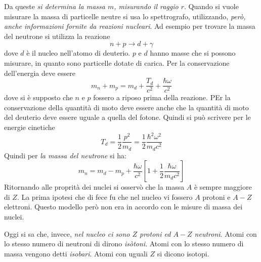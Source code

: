 Da queste \textit{si determina la massa $m$, misurando il raggio $r$}. Quando si
vuole misurare la massa di particelle neutre si usa lo spettrografo,
utilizzando, \textit{però, anche informazioni fornite da reazioni nucleari}. Ad
esempio per trovare la massa del neutrone si utilizza la reazione
\begin{equation}
n + p \longrightarrow d + \gamma
\end{equation}
dove $d$ è il nucleo nell'atomo di deuterio.
$p$ e $d$ hanno masse che si possono misurare, in quanto sono particelle dotate
di carica. Per la conservazione dell'energia deve essere
\begin{equation}
m_{n} + m_{p} = m_{d} + \dfrac{T_{d}}{c^{2}} + \dfrac{\hbar \omega}{c^{2}}
\end{equation}
dove si è supposto che $n$ e $p$ fossero a riposo prima della reazione. PEr la
conservazione della quantità di moto deve essere anche che la quantità di moto
del deuterio deve essere uguale a quella del fotone. Quindi si può scrivere per
le energie cinetiche
\begin{equation}
T_{d} = \dfrac{1}{2} \dfrac{p^{2}}{m_{d}} = \dfrac{1}{2} \dfrac{\hbar ^{2} 
\omega ^{2}}{m_{d} c^{2}}
\end{equation}
Quindi per \textit{la massa del neutrone} si ha:
\begin{equation}
m_{n} = m_{d} - m_{p} + \dfrac{\hbar \omega}{c^{2}} \left[1 + \dfrac{1}{2} 
\dfrac{\hbar \omega}{m_{d} c^{2}} \right]
\end{equation}
Ritornando alle proprità dei nuclei si osservò che la massa $A$ è sempre
maggiore di $Z$. La prima ipotesi che di fece fu che nel nucleo vi fossero $A$
protoni e $A-Z$ elettroni. Questo modello però non era in accordo con le misure
di massa dei nuclei.

Oggi si sa che, invece, \textit{nel nucleo ci sono $Z$ protoni ed $A-Z$
neutroni}. Atomi con lo stesso numero di neutroni di dirono \textit{isòtoni}.
Atomi con lo stesso numero di massa vengono detti \textit{isobari}. Atomi con
uguali $Z$ si dicono isotopi.

